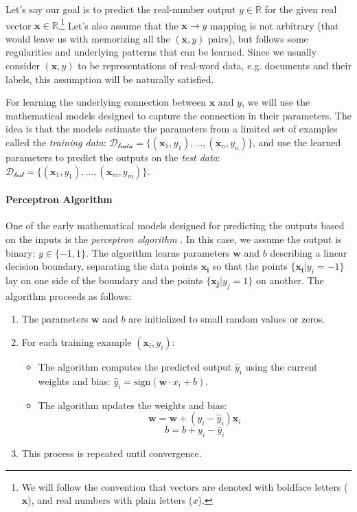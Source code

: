 Let's say our goal is to predict the real-number output $y \in \mathbb{R}$ for the given real vector $\mathbf{x} \in \mathbb{R}$.\footnote{We will follow the convention that vectors are denoted with boldface letters ($\mathbf{x}$), and real numbers with plain letters ($x$).} Let's also assume that the $\mathbf{x} \rightarrow y$ mapping is not arbitrary (that would leave us with memorizing all the $(\mathbf{x},y)$ pairs), but follows some regularities and underlying patterns that can be learned. Since we usually consider $(\mathbf{x},y)$ to be representations of real-word data, e.g. documents and their labels, this assumption will be naturally satisfied.

For learning the underlying connection between $\mathbf{x}$ and $y$, we will use the mathematical models designed to capture the connection in their parameters. The idea is that the models estimate the parameters from a limited set of examples called the \textit{training data}:  $\mathcal{D_{\text{train}}} = \{(\mathbf{x}_1, y_1), \ldots, (\mathbf{x}_{n}, y_{n})\}$, and use the learned parameters to predict the outputs on the \textit{test data}: $\mathcal{D_{\text{test}}} = \{(\mathbf{x}_1, y_1), \ldots, (\mathbf{x}_{m}, y_{m})\}$.

\paragraph{Perceptron Algorithm} One of the early mathematical models designed for predicting the outputs based on the inputs is the \emph{perceptron algorithm} \cite{rosenblatt1958perceptron}. In this case, we assume the output is binary: $y \in \{-1, 1\}$. The algorithm learns parameters $\textbf{w}$ and $b$ describing a linear decision boundary, separating the data points $\mathbf{x_i}$ so that the points $\{\mathbf{x_i} | y_i = -1\}$ lay on one side of the boundary and the points $\{\mathbf{x_j} | y_j = 1\}$ on another. The algorithm proceeds as follows:


\begin{enumerate}
    \item The parameters $\textbf{w}$ and $b$ are initialized to small random values or zeros.
    \item For each training example $(\mathbf{x}_i, y_i)$:
          \begin{itemize}
              \item The algorithm computes the predicted output $\hat{y}_i$ using the current weights and bias: $\hat{y}_i = \text{sign}(\textbf{w} \cdot x_i + b)$.
              \item The algorithm updates the weights and bias:
                    \[ \textbf{w} = \textbf{w} + (y_i - \hat{y}_i) \textbf{x}_i \]
                    \[ b = b + y_i - \hat{y}_i \]
          \end{itemize}
    \item This process is repeated until convergence.
\end{enumerate}


